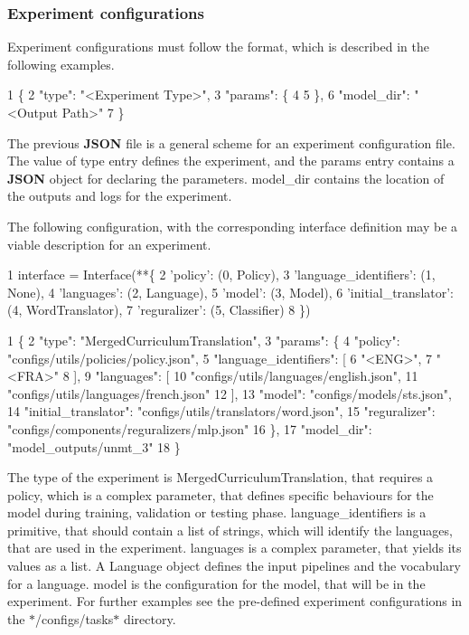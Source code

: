 \subsubsection*{Experiment configurations}

Experiment configurations must follow the format, which is described in the following examples.


\begin{DoxyCode}
1 \{
2     "type": "<Experiment Type>",
3     "params": \{
4 
5     \},
6     "model\_dir": "<Output Path>"
7 \}
\end{DoxyCode}


The previous {\bfseries J\+S\+ON} file is a general scheme for an experiment configuration file. The value of {\ttfamily type} entry defines the experiment, and the {\ttfamily params} entry contains a {\bfseries J\+S\+ON} object for declaring the parameters. {\ttfamily model\+\_\+dir} contains the location of the outputs and logs for the experiment.

The following configuration, with the corresponding interface definition may be a viable description for an experiment.


\begin{DoxyCode}
1 interface = Interface(**\{
2         'policy':               (0, Policy),
3         'language\_identifiers': (1, None),
4         'languages':            (2, Language),
5         'model':                (3, Model),
6         'initial\_translator':   (4, WordTranslator),
7         'reguralizer':          (5, Classifier)
8 \})
\end{DoxyCode}



\begin{DoxyCode}
1 \{
2     "type": "MergedCurriculumTranslation",
3     "params": \{
4         "policy": "configs/utils/policies/policy.json",
5         "language\_identifiers": [
6             "<ENG>",
7             "<FRA>"
8         ],
9         "languages": [
10             "configs/utils/languages/english.json",
11             "configs/utils/languages/french.json"
12         ],
13         "model": "configs/models/sts.json",
14         "initial\_translator": "configs/utils/translators/word.json",
15         "reguralizer": "configs/components/reguralizers/mlp.json"
16     \},
17     "model\_dir": "model\_outputs/unmt\_3"
18 \}
\end{DoxyCode}


The type of the experiment is {\ttfamily Merged\+Curriculum\+Translation}, that requires a {\ttfamily policy}, which is a complex parameter, that defines specific behaviours for the model during training, validation or testing phase. {\ttfamily language\+\_\+identifiers} is a primitive, that should contain a list of strings, which will identify the languages, that are used in the experiment. {\ttfamily languages} is a complex parameter, that yields its values as a list. A {\ttfamily Language} object defines the input pipelines and the vocabulary for a language. {\ttfamily model} is the configuration for the model, that will be in the experiment. For further examples see the pre-\/defined experiment configurations in the $\ast$/configs/tasks$\ast$ directory.

